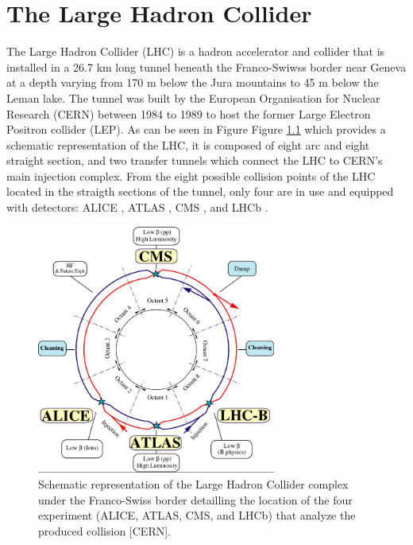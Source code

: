 \chapter{The Large Hadron Collider}
\label{chap:I-2-lhc}

	The Large Hadron Collider (LHC) \cite{Evans:2008zzb} is a hadron accelerator and collider that is installed in a 26.7 km long tunnel beneath the Franco-Swiwss border near Geneva at a depth varying from 170 m below the Jura mountains to 45 m below the Leman lake. The tunnel was built by the European Organisation for Nuclear Research (CERN) between 1984 to 1989 to host the former Large Electron Positron collider (LEP). As can be seen in Figure Figure \ref{fig:I-2-lhc-schematic} which provides a schematic representation of the LHC, it is composed of eight arc and eight straight section, and two transfer tunnels which connect the LHC to CERN's main injection complex. From the eight possible collision points of the LHC located in the straigth sections of the tunnel, only four are in use and equipped with detectors: ALICE \cite{1748-0221-3-08-S08002}, ATLAS \cite{1748-0221-3-08-S08003}, CMS \cite{1748-0221-3-08-S08004}, and LHCb \cite{1748-0221-3-08-S08005}. \\

	\begin{figure}[h!]
		\centering
		\includegraphics[width=0.7\textwidth]{img/I-2-lhc/lhc.jpg}
		\caption{Schematic representation of the Large Hadron Collider complex under the Franco-Swiss border detailling the location of the four experiment (ALICE, ATLAS, CMS, and LHCb) that analyze the produced collision [CERN].}
		\label{fig:I-2-lhc-schematic}
	\end{figure}

